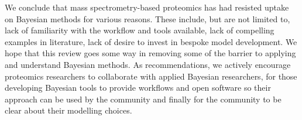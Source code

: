 \documentclass[12pt,english]{article}
\begin{document}
We conclude that mass spectrometry-based proteomics has had resisted uptake on Bayesian methods for various reasons. These include, but are not limited to, lack of familiarity with the workflow and tools available, lack of compelling examples in literature, lack of desire to invest in bespoke model development. We hope that this review goes some way in removing some of the barrier to applying and understand Bayesian methods. As recommendations, we actively encourage proteomics researchers to collaborate with applied Bayesian researchers, for those developing Bayesian tools to provide workflows and open software so their approach can be used by the community and finally for the community to be clear about their modelling choices.

	

	
\end{document}
